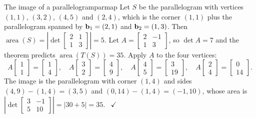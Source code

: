 \documentclass[11pt]{article}
\begin{document}
\begin{exmp}{The image of a parallelogram}{parmap}
Let $S$ be the parallelogram with vertices $(1,1)$, $(3,2)$, $(4,5)$ and $(2,4)$, which is the corner $(1,1)$ plus the parallelogram spanned by $\mathbf{b}_1=(2,1)$ and $\mathbf{b}_2=(1,3)$. Then $\operatorname{area}(S)=\left|\det\begin{bmatrix}2&1\\1&3\end{bmatrix}\right|=5$. Let $A=\begin{bmatrix}2&-1\\1&3\end{bmatrix}$, so $\det A=7$ and the theorem predicts $\operatorname{area}(T(S))=35$. Apply $A$ to the four vertices:
\[
A\begin{bmatrix}1\\1\end{bmatrix}=\begin{bmatrix}1\\4\end{bmatrix},\quad
A\begin{bmatrix}3\\2\end{bmatrix}=\begin{bmatrix}4\\9\end{bmatrix},\quad
A\begin{bmatrix}4\\5\end{bmatrix}=\begin{bmatrix}3\\19\end{bmatrix},\quad
A\begin{bmatrix}2\\4\end{bmatrix}=\begin{bmatrix}0\\14\end{bmatrix}.
\]
The image is the parallelogram with corner $(1,4)$ and sides $(4,9)-(1,4)=(3,5)$ and $(0,14)-(1,4)=(-1,10)$, whose area is $\left|\det\begin{bmatrix}3&-1\\5&10\end{bmatrix}\right|=|30+5|=35$. \ $\checkmark$
\end{exmp}
\end{document}
